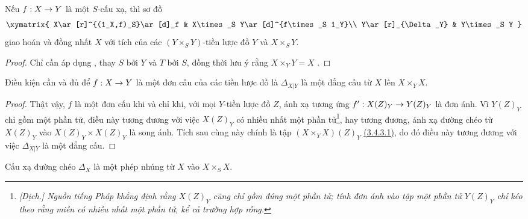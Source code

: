 \documentclass[oneside]{amsart}
\makeatletter
\newcommand{\ega@arrow}[2]{\mathchoice{#1}{#2}{#2}{#2}}
\renewcommand{\to}{\ega@arrow{\longrightarrow}{\rightarrow}}
\let\EGAOriginalLabel\label
\renewcommand{\label}[1]{\phantomsection\EGAOriginalLabel{#1}}
\makeatother
\begin{document}
\begin{corollary}[5.3.7]
\label{I.5.3.7}
Nếu $f:X\to Y$ là một $S$-cấu xạ, thì sơ đồ
\[
  \xymatrix{
    X\ar[r]^{(1_X,f)_S}\ar[d]_f &
    X\times_S Y\ar[d]^{f\times_S 1_Y}\\
    Y\ar[r]_{\Delta_Y} &
    Y\times_S Y
  }
\]
giao hoán và đồng nhất $X$ với tích của các $(Y\times_S Y)$-tiền lược đồ $Y$ và $X\times_S Y$.
\end{corollary}

\begin{proof}
Chỉ cần áp dụng , thay $S$ bởi $Y$ và $T$ bởi $S$, đồng thời lưu ý rằng $X\times_Y Y=X$ .
\end{proof}

\begin{proposition}[5.3.8]
\label{I.5.3.8}
Điều kiện cần và đủ để $f:X\to Y$ là một đơn cấu của các tiền lược đồ là $\Delta_{X|Y}$ là một đẳng cấu từ $X$ lên $X\times_Y X$.
\end{proposition}

\begin{proof}
Thật vậy, $f$ là một đơn cấu khi và chỉ khi, với mọi $Y$-tiền lược đồ $Z$, ánh xạ tương ứng $f':X(Z)_Y\to Y(Z)_Y$ là đơn ánh.
Vì $Y(Z)_Y$ chỉ gồm một phần tử, điều này tương đương với việc $X(Z)_Y$ có nhiều nhất một phần tử\footnote{\emph{[Dịch.] Nguồn tiếng Pháp khẳng định rằng $X(Z)_Y$ cũng chỉ gồm đúng một phần tử; tính đơn ánh vào tập một phần tử $Y(Z)_Y$ chỉ kéo theo rằng miền có nhiều nhất một phần tử, kể cả trường hợp rỗng.}}, hay tương đương, ánh xạ đường chéo từ $X(Z)_Y$ vào $X(Z)_Y\times X(Z)_Y$ là song ánh.
Tích sau cùng này chính là tập $(X\times_Y X)(Z)_Y$ \hyperref[I.3.4.3]{(3.4.3.1)}, do đó điều này tương đương với việc $\Delta_{X|Y}$ là một đẳng cấu.
\end{proof}

\begin{proposition}[5.3.9]
\label{I.5.3.9}
Cấu xạ đường chéo $\Delta_X$ là một phép nhúng từ $X$ vào $X\times_S X$.
\end{proposition}
\end{document}
